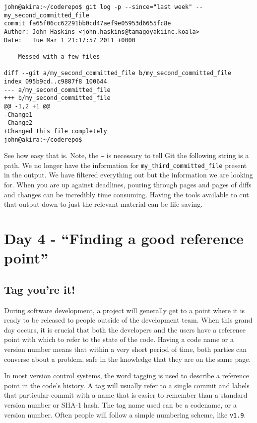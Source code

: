 \begin{Verbatim}[frame=leftline,framerule=1mm,fontsize=\relsize{-3}] 
john@akira:~/coderepo$ git log -p --since="last week" -- 
my_second_committed_file
commit fa65f06cc62291bb0cd47aef9e05953d6655fc8e
Author: John Haskins <john.haskins@tamagoyakiinc.koala>
Date:   Tue Mar 1 21:17:57 2011 +0000

    Messed with a few files

diff --git a/my_second_committed_file b/my_second_committed_file
index 095b9cd..c9887f8 100644
--- a/my_second_committed_file
+++ b/my_second_committed_file
@@ -1,2 +1 @@
-Change1
-Change2
+Changed this file completely
john@akira:~/coderepo$ 
\end{Verbatim}

See how easy that is.  Note, the \texttt{--} is necessary to tell Git the following string is a path.  We no longer have the information for \texttt{my\_third\_committed\_file} present in the output.  We have filtered everything out but the information we are looking for.  When you are up against deadlines, pouring through pages and pages of diffs and changes can be incredibly time consuming.  Having the tools available to cut that output down to just the relevant material can be life saving.

\section{Day 4 - ``Finding a good reference point''}
\subsection{Tag you're it!}

During software development, a project will generally get to a point where it is ready to be released to people outside of the development team.  When this grand day occurs, it is crucial that both the developers and the users have a reference point with which to refer to the state of the code.  Having a code name or a version number means that within a very short period of time, both parties can converse about a problem, safe in the knowledge that they are on the same page.

In most version control systems, the word tagging is used to describe a reference point in the code's history.  A tag will usually refer to a single commit and labels that particular commit with a name that is easier to remember than a standard version number or SHA-1 hash.  The tag name used can be a codename, or a version number.  Often people will follow a simple numbering scheme, like \texttt{v1.9}.  

